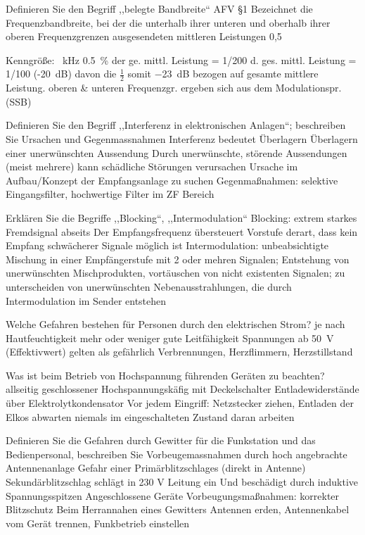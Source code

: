 \documentclass[avery5371,grid,frame,a4paper]{flashcards}
\newcommand{\card}[3]{
  \begin{flashcard}[{\chap} -- #1]{#2}#3\end{flashcard}
}
\begin{document}
\card{100}{Definieren Sie den Begriff ,,belegte Bandbreite``}{
  AFV §1 Bezeichnet die  Frequenzbandbreite,  bei der die unterhalb ihrer unteren und oberhalb ihrer
oberen Frequenzgrenzen ausgesendeten mittleren Leistungen 0,5 %

Kenngröße: \SI{}{\kilo\Hz}
\SI{0.5}{\percent} der ge. mittl. Leistung = 1/200 d. ges. 
mittl. Leistung  = 1/100 (-\SI{20}{\dB}) davon die $\frac12$
somit \SI{-23}{\dB}  bezogen auf gesamte mittlere
Leistung.
oberen \& unteren Frequenzgr. ergeben
sich aus dem Modulationspr.  (SSB)
}
\card{101}{Definieren Sie den Begriff ,,Interferenz in elektronischen Anlagen``; beschreiben Sie Ursachen und Gegenmassnahmen}{
  Interferenz bedeutet Überlagern
  Überlagern einer unerwünschten Aussendung
  Durch unerwünschte, störende Aussendungen (meist mehrere) kann schädliche Störungen verursachen
  Ursache im Aufbau/Konzept der Empfangsanlage zu suchen
  Gegenmaßnahmen: selektive Eingangsfilter, hochwertige Filter im ZF Bereich
}
\card{102}{Erklären Sie die Begriffe ,,Blocking``, ,,Intermodulation``}{
  Blocking: extrem starkes Fremdsignal abseits
  Der Empfangsfrequenz übersteuert Vorstufe derart, dass kein Empfang schwächerer Signale möglich ist
  Intermodulation: unbeabsichtigte Mischung in einer Empfängerstufe mit 2 oder mehren Signalen;
  Entstehung von unerwünschten Mischprodukten, vortäuschen von nicht existenten Signalen; zu unterscheiden von unerwünschten Nebenausstrahlungen, die durch Intermodulation im Sender entstehen
}
\card{103}{Welche Gefahren bestehen für Personen durch den elektrischen Strom?}{
  je nach Hautfeuchtigkeit mehr oder weniger
  gute Leitfähigkeit
  Spannungen ab \SI{50}{\volt} (Effektivwert) gelten als gefährlich
  Verbrennungen, Herzflimmern, Herzstillstand
}
\card{104}{Was ist beim Betrieb von Hochspannung führenden Geräten zu beachten?}{
  allseitig geschlossener Hochspannungskäfig mit Deckelschalter
  Entladewiderstände über Elektrolytkondensator
  Vor jedem Eingriff: Netzstecker ziehen, Entladen der Elkos abwarten
  niemals im eingeschalteten Zustand daran arbeiten
}
\card{105}{Definieren Sie die Gefahren durch Gewitter für die Funkstation und das Bedienpersonal, beschreiben Sie Vorbeugemassnahmen}{
  durch hoch angebrachte Antennenanlage Gefahr
  einer Primärblitzschlages (direkt in Antenne)
  Sekundärblitzschlag schlägt in 230 V Leitung ein 
  Und beschädigt durch induktive Spannungsspitzen
  Angeschlossene Geräte
  Vorbeugungsmaßnahmen: korrekter Blitzschutz
  Beim Herrannahen eines Gewitters Antennen 
  erden, Antennenkabel vom Gerät trennen,
  Funkbetrieb einstellen
}
\end{document}
